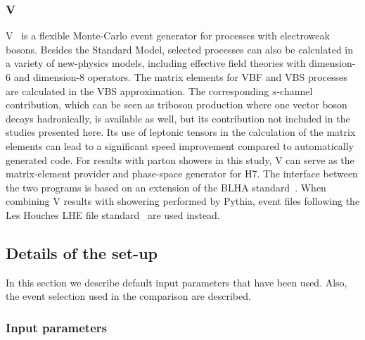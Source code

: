 \documentclass[11pt]{cernrep}
\newcommand{\Herwig}{H\protect\scalebox{0.8}{ERWIG}7\xspace}
\newcommand{\VBFNLO}{V\protect\scalebox{0.8}{BFNLO}\xspace}
\begin{document}
\subsubsection*{\protect\VBFNLO \label{vbs_VBFNLO}}
\VBFNLO~\cite{Arnold:2008rz,Arnold:2011wj,Baglio:2014uba} is a flexible
Monte-Carlo event generator for processes with electroweak bosons.
Besides the Standard Model, selected processes can also be calculated in
a variety of new-physics models, including effective field theories with
dimension-6 and dimension-8 operators.
The matrix elements for VBF and VBS processes are calculated in the VBS
approximation. The corresponding $s$-channel contribution, which can be
seen as triboson production where one vector boson decays hadronically,
is available as well, but its contribution not included in the studies
presented here.
Its use of leptonic tensors in the calculation of the matrix elements
can lead to a significant speed improvement compared to automatically
generated code.
For results with parton showers in this study, \VBFNLO can serve as the
matrix-element provider and phase-space generator for \Herwig. The
interface between the two programs is based on an extension of the BLHA
standard~\cite{Binoth:2010xt,Alioli:2013nda,Andersen:2014efa}. When
combining \VBFNLO results with showering performed by Pythia, event
files following the Les Houches LHE file
standard~\cite{Boos:2001cv,Alwall:2006yp} are used instead.


\subsection{Details of the set-up \label{setup}}

In this section we describe default input parameters that have been used.
Also, the event selection used in the comparison are described.

\subsubsection*{Input parameters}
\end{document}
